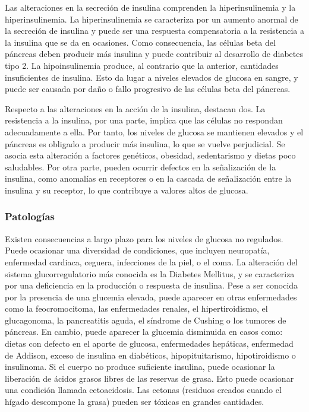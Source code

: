 Las alteraciones en la secreción de insulina comprenden la hiperinsulinemia y la hiperinsulinemia. La hiperinsulinemia se caracteriza por un aumento anormal de la secreción de insulina y puede ser una respuesta compensatoria a la resistencia a la insulina que se da en ocasiones. Como consecuencia, las células beta del páncreas deben producir más insulina y puede contribuir al desarrollo de diabetes tipo 2. La hipoinsulinemia produce, al contrario que la anterior, cantidades insuficientes de insulina. Esto da lugar a niveles elevados de glucosa en sangre, y puede ser causada por daño o fallo progresivo de las células beta del páncreas.

Respecto a las alteraciones en la acción de la insulina, destacan dos. La resistencia a la insulina, por una parte, implica que las células no respondan adecuadamente a ella. Por tanto, los niveles de glucosa se mantienen elevados y el páncreas es obligado a producir más insulina, lo que se vuelve perjudicial. Se asocia esta alteración a factores genéticos, obesidad, sedentarismo y dietas poco saludables. Por otra parte, pueden ocurrir defectos en la señalización de la insulina, como anomalías en receptores o en la cascada de señalización entre la insulina y su receptor, lo que contribuye a valores altos de glucosa.


\subsubsection{Patologías}
Existen consecuencias a largo plazo para los niveles de glucosa no regulados. Puede ocasionar una diversidad de condiciones, que incluyen neuropatía, enfermedad cardiaca, ceguera, infecciones de la piel, o el coma.
La alteración del sistema glucorregulatorio más conocida es la Diabetes Mellitus, y se caracteriza por una deficiencia en la producción o respuesta de insulina. Pese a ser conocida por la presencia de una glucemia elevada, puede aparecer en otras enfermedades como la feocromocitoma, las enfermedades renales, el hipertiroidismo, el glucagonoma, la pancreatitis aguda, el síndrome de Cushing o los tumores de páncreas.
En cambio, puede aparecer la glucemia disminuida en casos como: dietas con defecto en el aporte de glucosa, enfermedades hepáticas, enfermedad de Addison, exceso de insulina en diabéticos, hipopituitarismo, hipotiroidismo o insulinoma.
Si el cuerpo no produce suficiente insulina, puede ocasionar la liberación de ácidos grasos libres de las reservas de grasa. Esto puede ocasionar una condición llamada cetoacidosis. Las cetonas (residuos creados cuando el hígado descompone la grasa) pueden ser tóxicas en grandes cantidades.

